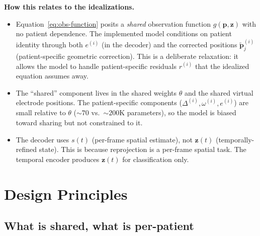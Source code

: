 \documentclass[11pt,letterpaper]{article}
\newcommand{\bfp}{\mathbf{p}}
\newcommand{\bfz}{\mathbf{z}}
\begin{document}
\textbf{How this relates to the idealizations.}
\begin{itemize}[leftmargin=2em]
\item Equation~\eqref{eq:obs-function} posits a \emph{shared} observation function $g(\bfp, \bfz)$ with no patient dependence. The implemented model conditions on patient identity through both $e^{(i)}$ (in the decoder) and the corrected positions $\tilde{\bfp}_j^{(i)}$ (patient-specific geometric correction). This is a deliberate relaxation: it allows the model to handle patient-specific residuals $r^{(i)}$ that the idealized equation assumes away.
\item The ``shared'' component lives in the shared weights $\theta$ and the shared virtual electrode positions. The patient-specific components ($\Delta^{(i)}, \omega^{(i)}, e^{(i)}$) are small relative to $\theta$ (${\sim}70$ vs.\ ${\sim}200$K parameters), so the model is biased toward sharing but not constrained to it.
\item The decoder uses $s(t)$ (per-frame spatial estimate), not $\bfz(t)$ (temporally-refined state). This is because reprojection is a per-frame spatial task. The temporal encoder produces $\bfz(t)$ for classification only.
\end{itemize}


\section{Design Principles}

\subsection{What is shared, what is per-patient}
\end{document}
